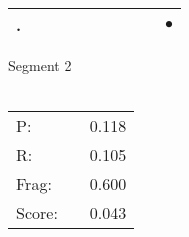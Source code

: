 \documentclass[landscape]{article}
\newcommand{\ssp}{\hspace{2pt}}
\newcommand{\mex}{\cellcolor{g}$\bullet$}
\begin{document}
\begin{tabular}{|l|p{10pt}|p{10pt}|p{10pt}|p{10pt}|p{10pt}|p{10pt}|p{10pt}|p{10pt}|p{10pt}|}
\hline
\ssp \cellcolor{ref8}. \ssp&\hspace{2pt}&\hspace{2pt}&\hspace{2pt}&\hspace{2pt}&\hspace{2pt}&\hspace{2pt}&\hspace{2pt}&\hspace{2pt}&\hspace{2pt}\mex\\
\hline
\end{tabular}

\vspace{6pt}
\noindent Segment 2\\\\
\noindent\begin{tabular}{lm{12pt}r}
\hline
P:&&0.118\\
R:&&0.105\\
Frag:&&0.600\\
Score:&&0.043\\
\end{tabular}

\newpage
\end{document}
